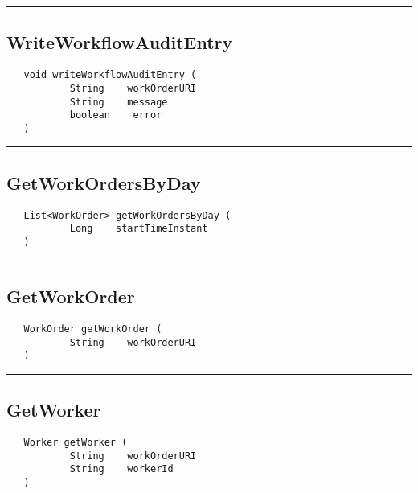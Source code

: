 \rule{15cm}{2pt}
\subsection{WriteWorkflowAuditEntry}
\label{Api:WriteWorkflowAuditEntry}
\begin{verbatim}
   void writeWorkflowAuditEntry (
           String    workOrderURI
           String    message
           boolean    error
   )
\end{verbatim}



\rule{15cm}{2pt}
\subsection{GetWorkOrdersByDay}
\label{Api:GetWorkOrdersByDay}
\begin{verbatim}
   List<WorkOrder> getWorkOrdersByDay (
           Long    startTimeInstant
   )
\end{verbatim}



\rule{15cm}{2pt}
\subsection{GetWorkOrder}
\label{Api:GetWorkOrder}
\begin{verbatim}
   WorkOrder getWorkOrder (
           String    workOrderURI
   )
\end{verbatim}



\rule{15cm}{2pt}
\subsection{GetWorker}
\label{Api:GetWorker}
\begin{verbatim}
   Worker getWorker (
           String    workOrderURI
           String    workerId
   )
\end{verbatim}



